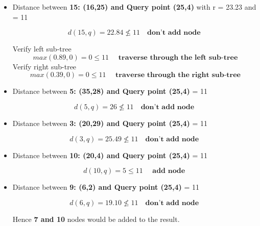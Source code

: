 \documentclass{article}
\begin{document}
\begin{itemize}
\newpage

    \item Distance between \textbf{15: (16,25) and Query point (25,4)} with r = 23.23 and \epsilon = 11

     \[ d(15,q)= 22.84 \nleq 11 \quad \textbf{don't add node } \]
     
    Verify left sub-tree \[ max(0.89,0) = 0 \le 11 \quad \textbf{ traverse through the left sub-tree}\]
    Verify right sub-tree \[ max(0.39,0) = 0 \le 11 \quad \textbf{ traverse through the right sub-tree}\]

    \item Distance between \textbf{5: (35,28) and Query point (25,4)} \epsilon = 11

     \[ d(5,q)= 26 \nleq 11 \quad \textbf{don't add node } \]

     \item Distance between \textbf{3: (20,29) and Query point (25,4)} \epsilon = 11

     \[ d(3,q)= 25.49 \nleq 11 \quad \textbf{don't add node } \]

     \item Distance between \textbf{10: (20,4) and Query point (25,4)} \epsilon = 11

     \[ d(10,q)= 5 \leq 11 \quad \textbf{ add node } \]

      \item Distance between \textbf{9: (6,2) and Query point (25,4)} \epsilon = 11

     \[ d(6,q)= 19.10 \nleq 11 \quad \textbf{don't add node } \]


     Hence \textbf{7 and 10 } nodes would be added to the result.




    
\end{itemize}
    
    
\end{document}
